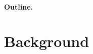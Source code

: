 \documentclass[11pt,
  titlepage=false,
  abstract=on,
]{scrreprt}
\begin{document}


\paragraph{Outline.}



\section{Background}
\label{sec:background}
\end{document}
